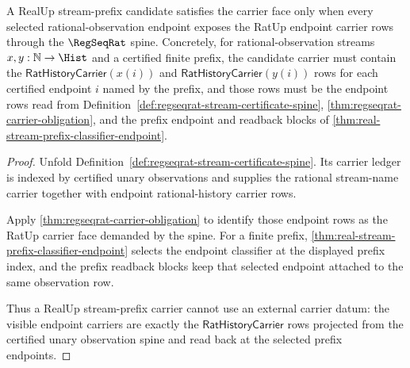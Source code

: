 \begin{theorem}
\label{thm:real-stream-prefix-carrier-obligation}
A RealUp stream-prefix candidate satisfies the carrier face only when every
selected rational-observation endpoint exposes the RatUp endpoint carrier rows
through the $\RegSeqRat$ spine. Concretely, for rational-observation streams
$x,y:\mathbb{N}\to\Hist$ and a certified finite prefix, the candidate carrier
must contain the $\mathsf{RatHistoryCarrier}(x(i))$ and
$\mathsf{RatHistoryCarrier}(y(i))$ rows for each certified endpoint $i$ named
by the prefix, and those rows must be the endpoint rows read from
Definition~\ref{def:regseqrat-stream-certificate-spine},
\autoref{thm:regseqrat-carrier-obligation}, and the prefix endpoint and
readback blocks of \autoref{thm:real-stream-prefix-classifier-endpoint}.
\end{theorem}
\begin{proof}
Unfold Definition~\ref{def:regseqrat-stream-certificate-spine}. Its carrier
ledger is indexed by certified unary observations and supplies the rational
stream-name carrier together with endpoint rational-history carrier rows.

Apply \autoref{thm:regseqrat-carrier-obligation} to identify those endpoint
rows as the RatUp carrier face demanded by the spine. For a finite prefix,
\autoref{thm:real-stream-prefix-classifier-endpoint} selects the endpoint
classifier at the displayed prefix index, and the prefix readback blocks keep
that selected endpoint attached to the same observation row.

Thus a RealUp stream-prefix carrier cannot use an external carrier datum: the
visible endpoint carriers are exactly the
$\mathsf{RatHistoryCarrier}$ rows projected from the certified unary
observation spine and read back at the selected prefix endpoints.
\end{proof}

